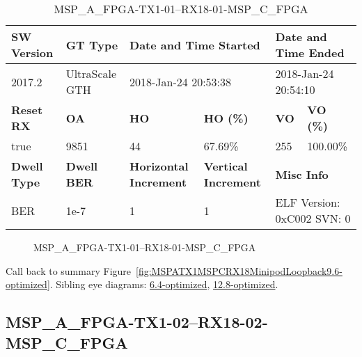 \begin{table}[h]
\centering
\caption{MSP\_A\_FPGA-TX1-01--RX18-01-MSP\_C\_FPGA}
\label{tab:MSPAFPGATX101RX1801MSPCFPGA9.6-optimized}
\begin{tabular}{@{}|l|l|l|l|l|l|@{}}
\toprule
\textbf{SW Version}                & \textbf{GT Type}   & \multicolumn{2}{l|}{\textbf{Date and Time Started}}            & \multicolumn{2}{l|}{\textbf{Date and Time Ended}}        \\ \midrule
2017.2                       & UltraScale GTH          & \multicolumn{2}{l|}{2018-Jan-24 20:53:38}                   & \multicolumn{2}{l|}{2018-Jan-24 20:54:10}               \\ \midrule
\textbf{Reset RX}                  & \textbf{OA} & \textbf{HO}   & \textbf{HO (\%)} & \textbf{VO} & \textbf{VO (\%)} \\ \midrule
true & 9851        & 44          & 67.69\%        & 255        & 100.00\%       \\ \midrule
\textbf{Dwell Type}                & \textbf{Dwell BER} & \textbf{Horizontal Increment} & \textbf{Vertical Increment}    & \multicolumn{2}{l|}{\textbf{Misc Info}}                  \\ \midrule
BER                            & 1e-7        & 1        & 1           & \multicolumn{2}{l|}{ELF Version: 0xC002 SVN: 0}                         \\ \bottomrule
\end{tabular}
\end{table}

\begin{figure}[h]
\caption{MSP\_A\_FPGA-TX1-01--RX18-01-MSP\_C\_FPGA} \label{fig:MSPAFPGATX101RX1801MSPCFPGA9.6-optimized}
\end{figure}

Call back to summary Figure~\ref{fig:MSPATX1MSPCRX18MinipodLoopback9.6-optimized}.
Sibling eye diagrams: \hyperref[sec:MSPAFPGATX101RX1801MSPCFPGA6.4-optimized]{6.4-optimized}, \hyperref[sec:MSPAFPGATX101RX1801MSPCFPGA12.8-optimized]{12.8-optimized}.

\clearpage
\newpage


\subsection{MSP\_A\_FPGA-TX1-02--RX18-02-MSP\_C\_FPGA}\label{sec:MSPAFPGATX102RX1802MSPCFPGA9.6-optimized}

